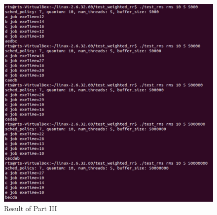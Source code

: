 \documentclass[12pt]{article}
\begin{document}
  \begin{figure}[H]
	\centering
	\includegraphics[width=1\textwidth]{fig_result_3}
	\caption{Result of Part III} \label{fig:result3}
	\end{figure}
\end{document}
